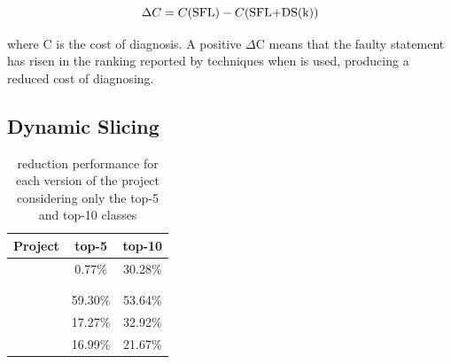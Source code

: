 \documentclass{article}
\begin{document}
\begin{equation}
    \Delta{}C = C(\textrm{SFL}) - C(\textrm{SFL{}+DS{}(k)})
\end{equation}

where C is the cost of diagnosis. 
A positive $\Delta$C means that the faulty statement has risen in
the ranking reported by \sfl{} techniques when \ds{} is used,
producing a reduced cost of diagnosing.





\subsection{Dynamic Slicing}

\begin{table}[h]
	\centering
	\setlength{\tabcolsep}{4pt}
	\begin{tabular}{lcc}
		\toprule
		Project             &  top-5  & top-10 \\
		\midrule

        \lang{}            & 0.77\% & 30.28\%\\
        \cmath{}           &  & \\
        \closure{}          &  & \\
		\chart{}			& 59.30\% & 53.64\% \\
        \jtime{}            & 17.27\% & 32.92\%\\
        \mockito{}          & 16.99\% & 21.67\%\\

		\bottomrule
	\end{tabular}
	\caption {\ds{} reduction performance for each version of the \chart{} project considering only the top-5 and top-10 classes}
	\label{tab:red}
\end{table}
\normalsize
\end{document}
